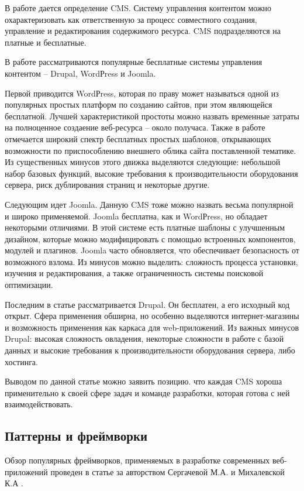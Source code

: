 В работе дается определение CMS.
Систему управления контентом можно охарактеризовать как ответственную за процесс совместного создания, управление и редактирования содержимого ресурса.
CMS подразделяются на платные и бесплатные.

В работе рассматриваются популярные бесплатные системы управления контентом -- Drupal, WordРress и Joomla.

Первой приводится WordРress, которая по праву может называться одной из популярных простых платформ по созданию сайтов, при этом являющейся бесплатной.
Лучшей характеристикой простоты можно назвать временные затраты на полноценное создаение веб-ресурса -- около получаса.
Также в работе отмечается широкий спектр бесплатных простых шаблонов, открывающих возможности по приспособлению внешнего облика сайта поставленной тематике.
Из существенных минусов этого движка выделяются следующие: небольшой набор базовых функций, высокие требования к производительности оборудования сервера, риск дублирования страниц и некоторые другие.

Следующим идет Joomla.
Данную CMS тоже можно назвать весьма популярной и широко применяемой.
Joomla бесплатна, как и WordРress, но обладает некоторыми отличиями.
В этой системе есть платные шаблоны с улучшенным дизайном, которые можно модифицировать с помощью встроенных компонентов, модулей и плагинов.
Joomla часто обновляется, что обеспечивает безопасность от возможного взлома.
Из минусов можно выделить: сложность процесса установки, изучения и редактирования, а также ограниченность системы поисковой оптимизации.

Последним в статье рассматривается Drupal.
Он бесплатен, а его исходный код открыт.
Сфера применения обширна, но особенно выделяются интернет-магазины и возможность применения как каркаса для web-приложений.
Из важных минусов Drupal: высокая сложность овладения, некоторые сложности в работе с базой данных и высокие требования к производительности оборудования сервера, либо хостинга.

Выводом по данной статье можно заявить позицию. что каждая CMS хороша применительно к своей сфере задач и команде разработки, которая готова с ней взаимодействовать.


\subsection{Паттерны и фреймворки}

Обзор популярных фреймворков, применяемых в разработке современных веб-приложений проведен в статье за авторством Сергачевой М.А. и Михалевской К.А \cite{sergacheva-framework}.

